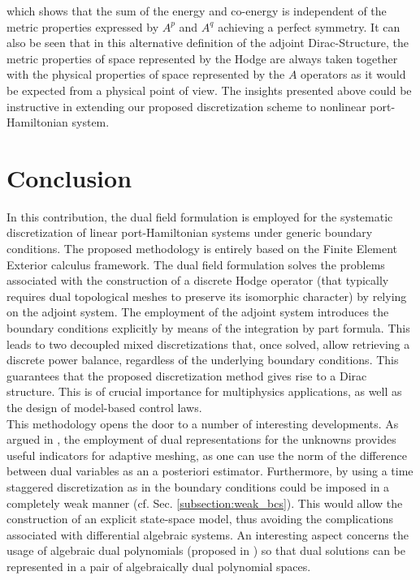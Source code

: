 \documentclass{elsarticle}
\begin{document}
\noindent which shows that the sum of the energy and co-energy is independent of the metric properties expressed by $A^p$ and $A^q$ achieving a perfect symmetry. It can also be seen that in this alternative definition of the adjoint Dirac-Structure, the metric properties of space represented by the Hodge are always taken together with the physical properties of space represented by the $A$ operators as it would be expected from a physical point of view.
The insights presented above could be instructive in extending our proposed discretization scheme to nonlinear port-Hamiltonian system.

\section{Conclusion}

In this contribution, the dual field formulation is employed for the systematic discretization of linear port-Hamiltonian systems under generic boundary conditions. The proposed methodology is entirely based on the Finite Element Exterior calculus framework. The dual field formulation solves the problems associated with the construction of a discrete Hodge operator (that typically requires dual topological meshes to preserve its isomorphic character) by relying on the adjoint system. The employment of the adjoint system introduces the boundary conditions explicitly by means of the integration by part formula. This leads to two decoupled mixed discretizations that, once solved, allow retrieving a discrete power balance, regardless of the underlying boundary conditions. This guarantees that the proposed discretization method gives rise to a Dirac structure. This is of crucial importance for multiphysics applications, as well as the design of model-based control laws. \\


This methodology opens the door to a number of interesting developments. As argued in \cite{zhang2021mass}, the employment of dual representations for the unknowns provides useful indicators for adaptive meshing, as one can use the norm of the difference between dual variables as an a posteriori estimator. Furthermore, by using a time staggered discretization as in \cite{zhang2021mass} the boundary conditions could be imposed in a completely weak manner (cf. Sec. \ref{subsection:weak_bcs}). This would allow the construction of an explicit state-space model, thus avoiding the complications associated with differential algebraic systems. An interesting aspect concerns the usage of algebraic dual polynomials (proposed in \cite{jain2021algdual}) so that dual solutions can be represented in a pair of algebraically dual polynomial spaces.\\
\end{document}
